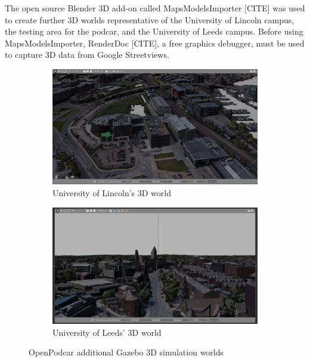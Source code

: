 \documentclass[a4paper]{article}
\begin{document}
The open source Blender 3D add-on called MapsModelsImporter [CITE] was used to create further 3D worlds representative of the University of Lincoln campus, the testing area for the podcar, and the University of Leeds campus. Before using MapsModelsImporter, RenderDoc [CITE], a free graphics debugger, must be used to capture 3D data from Google Streetviews.  


\begin{figure}
	\centering
	\begin{subfigure}{0.45\textwidth}
		\centering
		\includegraphics[width=\columnwidth]{figs_sim/INBLincoln_2.png}
		\caption{University of Lincoln's 3D world}
		\label{fig:INB_world}
	\end{subfigure}	
	\quad
	\begin{subfigure}{0.45\textwidth}
		\centering
		\includegraphics[width=\columnwidth]{figs_sim/woodhouseLeeds_5.png}
		\caption{University of Leeds' 3D world}
		\label{fig:Leeds_world}
	\end{subfigure}	
	\caption{OpenPodcar additional Gazebo 3D simulation worlds}
	\label{fig:gazebo_new_worlds}
\end{figure}
\end{document}
